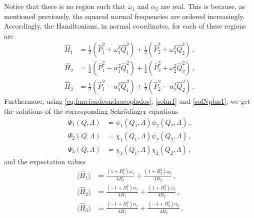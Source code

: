 \documentclass[12pt]{iopart}
\begin{document}
Notice that there is no region such that $\omega_1$ and $\alpha_2$ are real. This is because, as mentioned previously, the squared normal frequencies are ordered increasingly. Accordingly, the Hamiltonians, in normal coordinates, for each of these regions are
\begin{subequations}
\begin{align}
    \hat{H}_{1}&=\frac{1}{2} \left( \hat{P}_1^2+\omega_1^2 \hat{Q}_1^2\right)+\frac{1}{2} \left( \hat{P}_2^2+\omega_2^2 \hat{Q}_2^2\right)\,, \\
    \hat{H}_{2}&=\frac{1}{2} \left( \hat{P}_1^2-\alpha_1^2 \hat{Q}_1^2\right)+\frac{1}{2} \left( \hat{P}_2^2+\omega_2^2 \hat{Q}_2^2\right)\,, \\
    \hat{H}_{3}&=\frac{1}{2} \left( \hat{P}_1^2-\alpha_1^2 \hat{Q}_1^2\right)+\frac{1}{2} \left( \hat{P}_2^2-\alpha_2^2 \hat{Q}_2^2\right)\,.
\end{align}    
\end{subequations}
Furthermore, using \eqref{eq:funciondeondaacoplados}, \eqref{solm1} and \eqref{solNplus1}, we get the solutions of the corresponding Schrödinger equations 
\begin{subequations} 
\begin{align}
\Psi_{1}(Q,\Lambda)&=\psi_1(Q_1,\Lambda)\psi_{2}(Q_2,\Lambda) \,,\\
\Psi_{2}(Q,\Lambda)&=\chi_1(Q_1,\Lambda)\psi_2(Q_2,\Lambda)\,,\\
\Psi_{3}(Q,\Lambda)&=\chi_1(Q_1,\Lambda)\chi_2(Q_2,\Lambda)\,,
\end{align}
\end{subequations}
and the expectation values
\begin{subequations}
    \begin{align}
        \langle \hat{H}_{1} \rangle &= \frac{(1+B_1^2)\omega_1}{4B_1} +\frac{(1+B_2^2)\omega_2}{4B_2}\,,\\
        \langle \hat{H}_{2} \rangle &= \frac{(-1+B_1^2)\alpha_1}{4B_1}+\frac{(1+B_2^2)\omega_2}{4B_2}\,,\\
        \langle \hat{H}_{3} \rangle &= \frac{(-1+B_1^2)\alpha_1}{4B_1}+\frac{(-1+B_2^2)\alpha_2}{4B_2}\,.
    \end{align}
\end{subequations}
\end{document}
